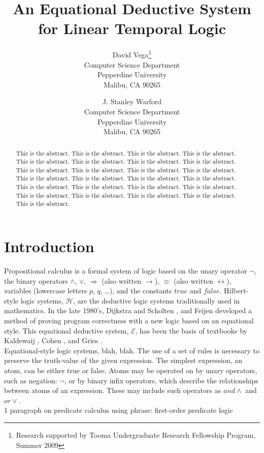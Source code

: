 \documentclass[fleqn, leqno]{article}
\title{An Equational Deductive System\\for Linear Temporal Logic}
\author{David Vega\thanks{Research supported by Tooma Undergraduate Research Fellowship Program, Summer 2009}\\
   Computer Science Department\\
   Pepperdine University\\
   Malibu, CA 90265
   \and
   J. Stanley Warford\\
   Computer Science Department\\
   Pepperdine University\\
   Malibu, CA 90265}
\date{} %
\newcommand{\impl}{\ensuremath{\Rightarrow}}        %
\begin{document}
\maketitle
\begin{abstract}
This is the abstract. This is the abstract. This is the abstract. This is the abstract. This is the abstract.
This is the abstract. This is the abstract. This is the abstract. This is the abstract. This is the abstract. 
This is the abstract. This is the abstract. This is the abstract. This is the abstract. This is the abstract. 
This is the abstract. This is the abstract. This is the abstract. This is the abstract. This is the abstract. 
This is the abstract. This is the abstract. This is the abstract. This is the abstract. This is the abstract. 
\end{abstract}

\thispagestyle{plain}

\section{Introduction}

Propositional calculus is a formal system of logic based on the unary operator $\lnot$, the binary operators $\land$, $\lor$, $\impl$
(also written $\rightarrow$),  $\equiv$ (also written $\leftrightarrow$), variables (lowercase letters $p$, $q$, \dots), and the
constants $true$ and $false$.
Hilbert-style logic systems, $\mathcal{H}$, are the deductive logic systems traditionally used in mathematics.
In the late 1980's, Dijkstra and Scholten \cite{DandS}, and Feijen \cite{Feij} developed a method of proving
program correctness with a new logic based on an equational style.
This equational deductive system, $\mathcal{E}$, has been the basis of textbooks by Kaldewaij \cite{Kald},
Cohen \cite{Cohen}, and Gries \cite{LADM}.\\

Equational-style logic systems, blah, blah.
The use of a set of rules is necessary to preserve the truth-value of the given expression.
The simplest expression, an atom, can be either true or false. 
Atoms may be operated on by unary operators, such as negation: $\lnot$, or by binary infix operators, which describe the relationships between atoms of an expression.
These may include such operators as $and \land$ and $or \lor$.\\

1 paragraph on predicate calculus using phrase: first-order predicate logic\\
\end{document}
